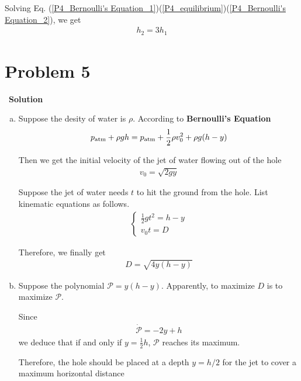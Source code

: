 \documentclass[12pt,a4paper]{article}
\begin{document}
Solving Eq. (\ref{P4_Bernoulli's Equation_1})(\ref{P4_equilibrium})(\ref{P4_Bernoulli's Equation_2}), we get
\begin{align}
	h_2 = 3h_1
\end{align}





\section*{\large \textbf{Problem 5}}~{\textbf{Solution}}

\begin{enumerate}[(a)]
\item Suppose the desity of water is $\rho$. According to \textbf{Bernoulli's Equation}
	\begin{align}
		p_{\rm atm} + \rho g h = p_{\rm atm} + \frac{1}{2}\rho v_0 ^2 + \rho g(h-y)
	\label{P5_Bernoulli's Equation}
	\end{align}
	
Then we get the initial velocity of the jet of water flowing out of the hole
\begin{align}
	v_0 = \sqrt{2gy}
\end{align}

Suppose the jet of water needs $t$ to hit the ground from the hole. List kinematic equations as follows.
\begin{align}
	\left\{
		\begin{array}{l}			
				\frac{1}{2}gt^2 = h-y\\
				v_0t = D
		\end{array}
	\right.
	\label{P5_kinematics}
	\end{align}
	
Therefore, we finally get
\begin{align}
	D = \sqrt{4y(h-y)}
\end{align}

\item Suppose the polynomial $\mathcal{P} = y(h-y)$. Apparently, to maximize $D$ is to maximize $\mathcal{P}$.

Since
\begin{align*}
	\dot{\mathcal{P}} = -2y + h
\end{align*}
we deduce that if and only if $y = \frac{1}{2}h$, $\mathcal{P}$ reaches its maximum.

Therefore, the hole should be placed at a depth $y = h/2$ for the jet to cover a maximum horizontal distance
\end{enumerate}
\end{document}
